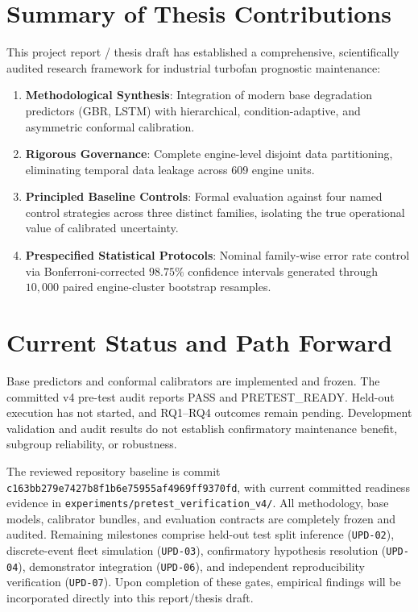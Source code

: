 \section{Summary of Thesis Contributions}
This project report / thesis draft has established a comprehensive, scientifically audited research framework for industrial turbofan prognostic maintenance:
\begin{enumerate}
    \item \textbf{Methodological Synthesis}: Integration of modern base degradation predictors (GBR, LSTM) with hierarchical, condition-adaptive, and asymmetric conformal calibration.
    \item \textbf{Rigorous Governance}: Complete engine-level disjoint data partitioning, eliminating temporal data leakage across 609 engine units.
    \item \textbf{Principled Baseline Controls}: Formal evaluation against four named control strategies across three distinct families, isolating the true operational value of calibrated uncertainty.
    \item \textbf{Prespecified Statistical Protocols}: Nominal family-wise error rate control via Bonferroni-corrected $98.75\%$ confidence intervals generated through $10{,}000$ paired engine-cluster bootstrap resamples.
\end{enumerate}

\section{Current Status and Path Forward}
Base predictors and conformal calibrators are implemented and frozen. The committed v4 pre-test audit reports PASS and PRETEST\_READY. Held-out execution has not started, and RQ1–RQ4 outcomes remain pending. Development validation and audit results do not establish confirmatory maintenance benefit, subgroup reliability, or robustness.

The reviewed repository baseline is commit \texttt{c163bb279e7427b8f1b6e75955af4969ff9370fd}, with current committed readiness evidence in \texttt{experiments/pretest\_verification\_v4/}. All methodology, base models, calibrator bundles, and evaluation contracts are completely frozen and audited. Remaining milestones comprise held-out test split inference (\texttt{UPD-02}), discrete-event fleet simulation (\texttt{UPD-03}), confirmatory hypothesis resolution (\texttt{UPD-04}), demonstrator integration (\texttt{UPD-06}), and independent reproducibility verification (\texttt{UPD-07}). Upon completion of these gates, empirical findings will be incorporated directly into this report/thesis draft.
